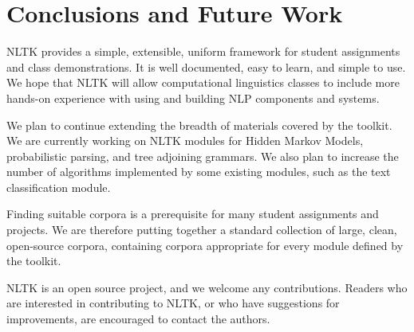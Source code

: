 \documentclass[11pt]{article}
\begin{document}
\section{Conclusions and Future Work}
\label{sec:conclusion}

NLTK provides a simple, extensible, uniform framework for student
assignments and class demonstrations.  It is well documented, easy to
learn, and simple to use.  We hope that NLTK will allow computational
linguistics classes to include more hands-on experience with using and
building NLP components and systems.


We plan to continue extending the breadth of materials covered by the
toolkit.  We are currently working on NLTK modules for Hidden Markov
Models, probabilistic parsing, and tree adjoining grammars.  We also
plan to increase the number of algorithms implemented by some existing
modules, such as the text classification module.  

Finding suitable corpora is a prerequisite for many student
assignments and projects.  We are therefore putting together a
standard collection of large, clean, open-source corpora, containing
corpora appropriate for every module defined by the toolkit.

NLTK is an open source project, and we welcome any contributions.
Readers who are interested in contributing to NLTK, or who have
suggestions for improvements, are encouraged to contact the authors.




\end{document}
